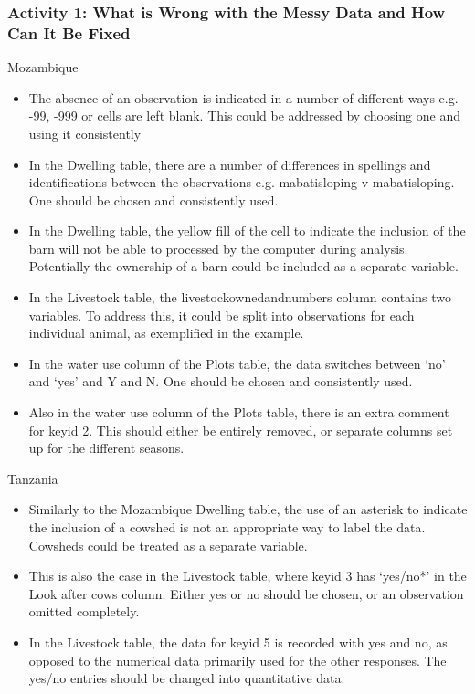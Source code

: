 \documentclass{article}
\begin{document}
\begin{FlushLeft}
\subsubsection*{Activity 1: What is Wrong with the Messy Data and How Can It Be Fixed}
Mozambique 
\begin{itemize}
\item The absence of an observation is indicated in a number of different ways e.g. -99, -999 or cells are left blank. This could be addressed by choosing one and using it consistently
\item In the Dwelling table, there are a number of differences in spellings and identifications between the observations e.g. mabati\textunderscore sloping v mabatisloping. One should be chosen and consistently used.
\item In the Dwelling table, the yellow fill of the cell to indicate the inclusion of the barn will not be able to processed by the computer during analysis. Potentially the ownership of a barn could be included as a separate variable.
\item In the Livestock table, the livestock\textunderscore owned\textunderscore and\textunderscore numbers column contains two variables. To address this, it could be split into observations for each individual animal, as exemplified in the example.
\item In the water use column of the Plots table, the data switches between ‘no’ and ‘yes’ and Y and N. One should be chosen and consistently used.
\item Also in the water use column of the Plots table, there is an extra comment for key\textunderscore id 2. This should either be entirely removed, or separate columns set up for the different seasons.
\end{itemize}
Tanzania
\begin{itemize}
\item Similarly to the Mozambique Dwelling table, the use of an asterisk to indicate the inclusion of a cowshed is not an appropriate way to label the data. Cowsheds could be treated as a separate variable.
\item This is also the case in the Livestock table, where key\textunderscore id 3 has ‘yes/no*’ in the Look after cows column. Either yes or no should be chosen, or an observation omitted completely.
\item In the Livestock table, the data for key\textunderscore id 5 is recorded with yes and no, as opposed to the numerical data primarily used for the other responses. The yes/no entries should be changed into quantitative data.

\end{itemize}
\end{FlushLeft}
\end{document}
